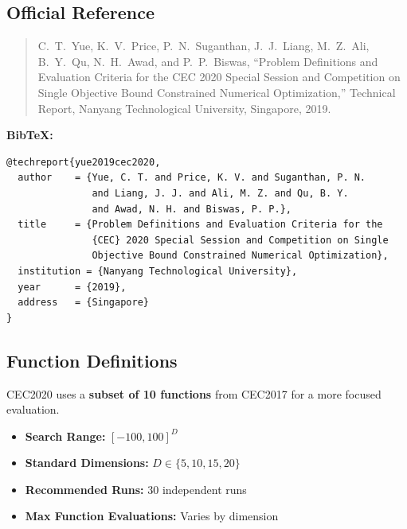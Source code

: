 \documentclass[11pt]{article}
\begin{document}
\subsection{Official Reference}

\begin{quote}
C.~T.~Yue, K.~V.~Price, P.~N.~Suganthan, J.~J.~Liang, M.~Z.~Ali, B.~Y.~Qu, N.~H.~Awad, and P.~P.~Biswas,
``Problem Definitions and Evaluation Criteria for the CEC 2020 Special Session and Competition on Single Objective Bound Constrained Numerical Optimization,''
Technical Report, Nanyang Technological University, Singapore, 2019.
\end{quote}

\noindent\textbf{BibTeX:}
\begin{verbatim}
@techreport{yue2019cec2020,
  author    = {Yue, C. T. and Price, K. V. and Suganthan, P. N. 
               and Liang, J. J. and Ali, M. Z. and Qu, B. Y. 
               and Awad, N. H. and Biswas, P. P.},
  title     = {Problem Definitions and Evaluation Criteria for the 
               {CEC} 2020 Special Session and Competition on Single 
               Objective Bound Constrained Numerical Optimization},
  institution = {Nanyang Technological University},
  year      = {2019},
  address   = {Singapore}
}
\end{verbatim}

\subsection{Function Definitions}

CEC2020 uses a \textbf{subset of 10 functions} from CEC2017 for a more focused evaluation.

\begin{itemize}
    \item \textbf{Search Range:} $[-100, 100]^D$
    \item \textbf{Standard Dimensions:} $D \in \{5, 10, 15, 20\}$
    \item \textbf{Recommended Runs:} 30 independent runs
    \item \textbf{Max Function Evaluations:} Varies by dimension
\end{itemize}
\end{document}
